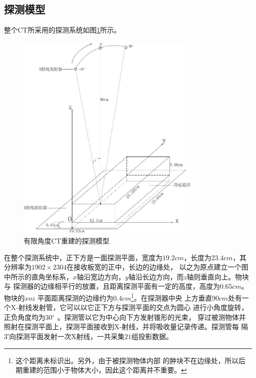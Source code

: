 \subsection{探测模型}
整个CT所采用的探测系统如图\ref{fig:model1}所示。
\begin{figure}[h]
\center
\includegraphics[width=0.8\textwidth]{figure/model1}
\caption{有限角度CT重建的探测模型}\label{fig:model1}
\end{figure}
在整个探测系统中，正下方是一面探测平面，宽度为$19.2cm$，长度为$23.4cm$，其分辨率为$1902\times2304$在接收板宽的正中，长边的边缘处，
以之为原点建立一个图中所示的直角坐标系，$x$轴沿宽边方向，$y$轴沿长边方向，而$z$轴则垂直向上。物块与
探测器的边缘相平行的放置，且距离探测平面有一定的高度，高度为$0.65cm$。物块的$xoz$
平面距离探测的边缘约为$0.4cm$\footnote{这个距离未标识出。另外，由于被探测物体内部
的肿块不在边缘处，所以后期重建的范围小于物体大小，因此这个距离并不重要。}。在探测器中央
上方垂直$90cm$处有一个X-射线发射管，它可以以它正下方与探测平面的交点为圆心
进行小角度旋转，正负角度均为$30^。$。探测管以它为中心向下方发射锥形的光束，
穿过被测物体并照射在探测平面上，探测平面接收到X-射线，并将吸收量记录传递。探测管每
隔$3^\centerdot$向探测平面发射一次X射线，一共采集$21$组投影数据。
